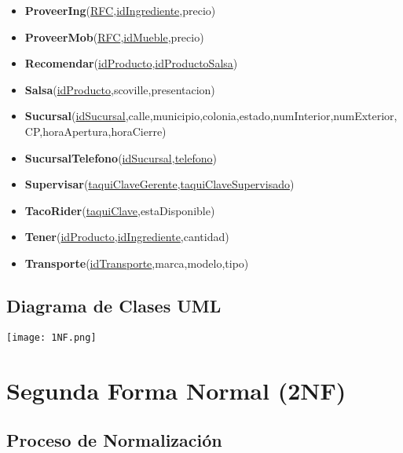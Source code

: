 \documentclass[11pt,letterpaper]{article}
\begin{document}
\begin{itemize}
\item \footnotesize{\textbf{ProveerIng}(\underline{RFC},\underline{idIngrediente},precio)}
\item \footnotesize{\textbf{ProveerMob}(\underline{RFC},\underline{idMueble},precio)}
\item \footnotesize{\textbf{Recomendar}(\underline{idProducto},\underline{idProductoSalsa})}
\item \footnotesize{\textbf{Salsa}(\underline{idProducto},scoville,presentacion)}
\item {\footnotesize \textbf{Sucursal}(\underline{idSucursal},calle,municipio,colonia,estado,numInterior,numExterior,CP,horaApertura,horaCierre)}
\item \footnotesize{\textbf{SucursalTelefono}(\underline{idSucursal},\underline{telefono})}
\item \footnotesize{\textbf{Supervisar}(\underline{taquiClaveGerente},\underline{taquiClaveSupervisado})}
\item \footnotesize{\textbf{TacoRider}(\underline{taquiClave},estaDisponible)}
\item \footnotesize{\textbf{Tener}(\underline{idProducto},\underline{idIngrediente},cantidad)}
\item \footnotesize{\textbf{Transporte}(\underline{idTransporte},marca,modelo,tipo)}



\end{itemize}
\subsection{Diagrama de Clases UML}

\begin{landscape}
\begin{center}
\begin{minipage}{1\linewidth}
\texttt{[image: 1NF.png]}
\end{minipage}
\end{center}
\end{landscape}

\section{Segunda Forma Normal (2NF)}

\subsection{Proceso de Normalización}
\end{document}
